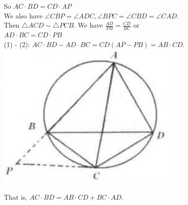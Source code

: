 \documentclass{article}
\begin{document}
So \(A C \cdot B D=C D \cdot A P\)\\
We also have \(\angle C B P=\angle A D C, \angle B P C=\angle C B D=\angle C A D\).\\
Then \(\triangle A C D \sim \triangle P C B\). We have \(\frac{A D}{P B}=\frac{C D}{B C}\) or\\
\(A D \cdot B C=C D \cdot P B\)\\
(1) - (2): \(A C \cdot B D-A D \cdot B C=C D(A P-P B)=A B \cdot C D\).\\
\centering
\includegraphics[width=\textwidth]{images/193(1).jpg}

That is, \(A C \cdot B D=A B \cdot C D+B C \cdot A D\).
\end{document}
